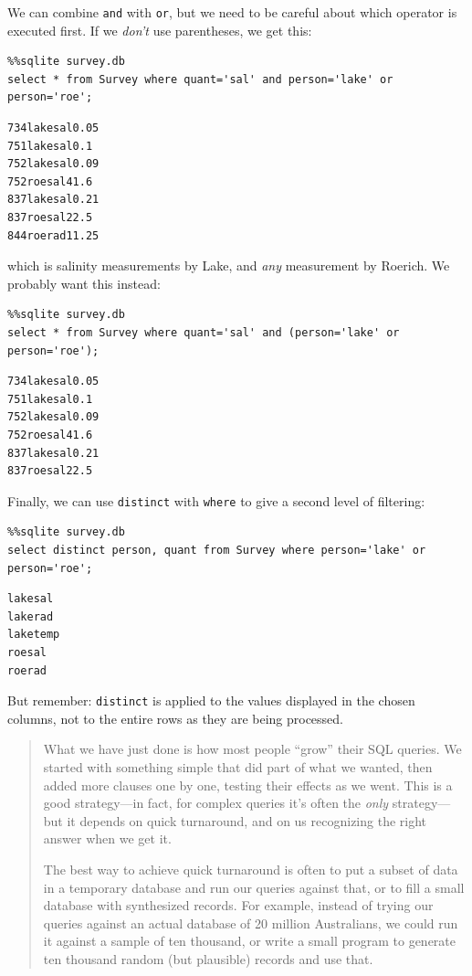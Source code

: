 \documentclass{book}
\begin{document}
We can combine \texttt{and} with \texttt{or}, but we need to be careful
about which operator is executed first. If we \emph{don't} use
parentheses, we get this:

\begin{verbatim}
%%sqlite survey.db
select * from Survey where quant='sal' and person='lake' or person='roe';
\end{verbatim}

\begin{verbatim}
734lakesal0.05
751lakesal0.1
752lakesal0.09
752roesal41.6
837lakesal0.21
837roesal22.5
844roerad11.25
\end{verbatim}

which is salinity measurements by Lake, and \emph{any} measurement by
Roerich. We probably want this instead:

\begin{verbatim}
%%sqlite survey.db
select * from Survey where quant='sal' and (person='lake' or person='roe');
\end{verbatim}

\begin{verbatim}
734lakesal0.05
751lakesal0.1
752lakesal0.09
752roesal41.6
837lakesal0.21
837roesal22.5
\end{verbatim}

Finally, we can use \texttt{distinct} with \texttt{where} to give a
second level of filtering:

\begin{verbatim}
%%sqlite survey.db
select distinct person, quant from Survey where person='lake' or person='roe';
\end{verbatim}

\begin{verbatim}
lakesal
lakerad
laketemp
roesal
roerad
\end{verbatim}

But remember: \texttt{distinct} is applied to the values displayed in
the chosen columns, not to the entire rows as they are being processed.

\begin{quote}
What we have just done is how most people ``grow'' their SQL queries. We
started with something simple that did part of what we wanted, then
added more clauses one by one, testing their effects as we went. This is
a good strategy---in fact, for complex queries it's often the
\emph{only} strategy---but it depends on quick turnaround, and on us
recognizing the right answer when we get it.

The best way to achieve quick turnaround is often to put a subset of
data in a temporary database and run our queries against that, or to
fill a small database with synthesized records. For example, instead of
trying our queries against an actual database of 20 million Australians,
we could run it against a sample of ten thousand, or write a small
program to generate ten thousand random (but plausible) records and use
that.
\end{quote}
\end{document}
